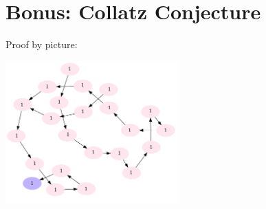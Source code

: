 \setcounter{section}{0}

\section{Bonus: Collatz Conjecture}
\vspace{-0.1cm}
Proof by picture:
\begin{center}
\includegraphics[width=0.5\textwidth]{collatz.png}
\end{center}
